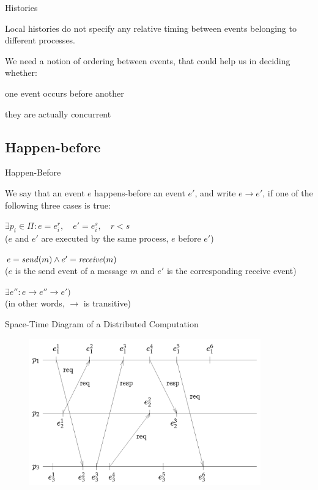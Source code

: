 \begin{frame}{Histories}

\BIL
\item Local histories do not specify any relative timing between events
  belonging to different processes.
\item We need a notion of ordering between events, that could help
  us in deciding whether:
  \BI
  \item one event occurs before another
  \item they are actually concurrent
  \EI
\EIL

\end{frame}

\subsection{Happen-before}

\begin{frame}{Happen-Before}

\begin{definition}
We say that an event $e$ \alert{happens-before} an event $e'$, and write \alert{$e \rightarrow e'$}, if one of the following three cases is true:
\smallskip
\BE
\item $\exists p_i \in \Pi: e = e_i^r, \quad e'=e_i^s, \quad r<s$ \\
  ($e$ and $e'$ are executed by the same process, $e$ before $e'$)
\smallskip
\item $e = \mathit{send}(m) \wedge e' = \mathit{receive}(m)$ \\
  ($e$ is the send event of a message $m$ and $e'$ is the corresponding
   receive event)
\smallskip
\item $\exists e'': e \rightarrow e'' \rightarrow e')$ \\
  (in other words, $\rightarrow$ is transitive)
\EE
\end{definition}
 
\end{frame}

\begin{frame}{Space-Time Diagram of a Distributed Computation}

\begin{figure} 
\includegraphics[width=10cm]{figs/02/figure-1}
\end{figure}	

\end{frame}


